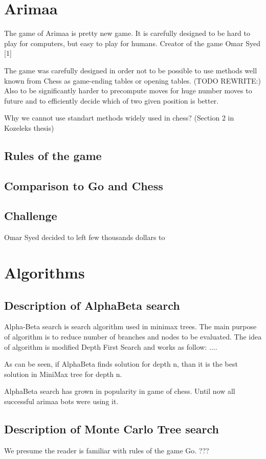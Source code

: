 \documentclass[12pt,titlepage,fleqn]{report}
\begin{document}
\chapter{Arimaa}
The game of Arimaa is pretty new game. It is carefully designed to be hard to
play for computers, but easy to play for humans. Creator of the game Omar
Syed [1]

The game was carefully designed in order not to be possible to use methods
well known from Chess as game-ending tables or opening tables. (TODO
REWRITE:) Also to be significantly harder to precompute moves for huge
number moves to future and to efficiently decide which of two given position
is better.

Why we cannot use standart methods widely used in chess? (Section 2 in Kozeleks thesis)

\section{Rules of the game}

\section{Comparison to Go and Chess}

\section{Challenge}
Omar Syed decided to left few thousands dollars to


\chapter{Algorithms}

\section{Description of AlphaBeta search}
Alpha-Beta search is search algorithm used in minimax trees. The main purpose
of algorithm is to reduce number of branches and nodes to be evaluated. The
idea of algorithm is modified Depth First Search and works as follow:
....

As can be seen, if AlphaBeta finds solution for depth n, than it is the best
solution in MiniMax tree for depth n.

AlphaBeta search has grown in popularity in game of chess. Until now all
successful arimaa bots were using it.


\section{Description of Monte Carlo Tree search}
We presume the reader is familiar with rules of the game Go. {???}
\end{document}
